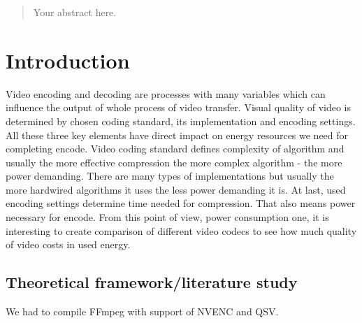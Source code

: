 \documentclass[12pt,twoside]{article}
\begin{document}
\maketitle


\begin{abstract}
\label{sec:abstract}

Your abstract here.

\end{abstract}


\tableofcontents
{}
\printglossary[type=\acronymtype]



\clearpage
\section{Introduction}
\label{sect:introduction}
Video encoding and decoding are processes with many variables which can influence the output of whole process of video transfer. Visual quality of video is determined by chosen coding standard, its implementation and encoding settings. All these three key elements have direct impact on energy resources we need for completing encode. Video coding standard defines complexity of algorithm and usually the more effective compression the more complex algorithm - the more power demanding. There are many types of implementations but usually the more hardwired algorithms it uses the less power demanding it is. At last, used encoding settings determine time needed for compression. That also means power necessary for encode. From this point of view, power consumption one, it is interesting to create comparison of different video codecs to see how much quality of video costs in used energy.


\subsection{Theoretical framework/literature study}
\label{sect:framework}


We had to compile FFmpeg with support of NVENC and QSV.\cite{intelffmpeg,nvidiaffmpeg}
\end{document}
